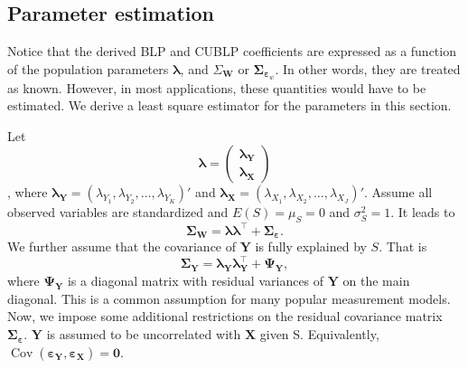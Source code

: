 \documentclass[man, floatsintext]{apa7}
\newcommand{\mbf}[1]{\bm{#1}}
\newcommand{\bX}{\mbf{X}}
\newcommand{\bY}{\mbf{Y}}
\newcommand{\beps}{\mbf{\varepsilon}}
\newcommand{\blambda}{\mbf{\lambda}}
\newcommand{\bW}{\mbf{W}}
\DeclareMathOperator{\Cov}{Cov}
\begin{document}
  \subsection{Parameter estimation}
  Notice that the derived BLP and CUBLP coefficients are expressed as a function
  of the population parameters $\blambda$, and $\Sigma_{\bW}$ or $\mbf{\Sigma}_
  {\beps_w}$. In other words, they are treated as known. However, in most
  applications, these quantities would have to be estimated. We derive a least
  square estimator for the parameters in this section.

  Let \[ \blambda = \left (\begin{array}{r} \blambda_{\bY} \\ \blambda_{\bX} 
  \end{array} \right) \], where $\blambda_{\bY} = (\lambda_{Y_1}, \lambda_{Y_2},
  \dots, \lambda_{Y_K})'$ and $\blambda_{\bX} = (\lambda_{X_1}, \lambda_{X_2},
  \dots, \lambda_{X_J})'$.
  Assume all observed variables are standardized and $E(S) = \mu_S = 0$ and
  $\sigma^2_{S} = 1$. It leads to
  \begin{equation}
  \mbf{\Sigma}_{\bW} = \blambda \blambda^\top + \mbf{\Sigma}_{\beps}.
  \end{equation}
  We further assume that the covariance of $\bY$ is fully explained by $S$. That
  is
  \begin{equation}
    \mbf{\Sigma}_{\bY} = \blambda_{\bY} \blambda_{\bY}^\top + \mbf{\Psi}_{\bY},
  \end{equation}
  where $\mbf{\Psi}_{\bY}$ is a diagonal matrix with residual variances of $\bY$
  on the main diagonal. This is a common assumption for many popular measurement
  models. Now, we impose some additional restrictions on the residual covariance
  matrix $\mbf{\Sigma}_{\beps}$. $\bY$ is assumed to be uncorrelated with $\bX$
  given S. Equivalently, $\Cov(\beps_{\bY}, \beps_{\bX}) = \mbf{0}$.
\end{document}
